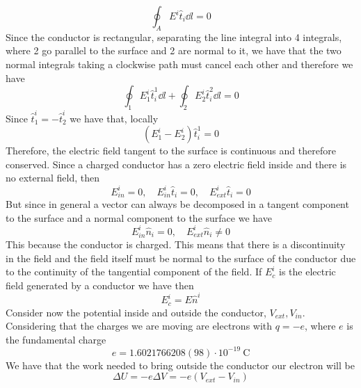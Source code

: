 \documentclass[../electromagnetism]{subfiles}
\begin{document}
\begin{equation}
	\oint_AE^i\hat{t}_i\dd l=0
	\label{eq:between2cond}
\end{equation}
Since the conductor is rectangular, separating the line integral into 4 integrals, where 2 go parallel to the surface and 2 are normal to it, we have that the two normal integrals taking a clockwise path must cancel each other and therefore we have
\begin{equation}
	\oint_1E^i_1\hat{t}^1_i\dd l+\oint_2E^i_2\hat{t}^2_i\dd l=0
	\label{eq:parallelint}
\end{equation}
Since $\hat{t}_1^i=-\hat{t}_2^i$ we have that, locally
\begin{equation}
	\left( E^i_1-E^i_2 \right)\hat{t}^1_i=0
	\label{eq:constangcond}
\end{equation}
Therefore, the electric field tangent to the surface is continuous and therefore conserved.
Since a charged conductor has a zero electric field inside and there is no external field, then
\begin{equation*}
	E^i_{in}=0,\quad E^i_{in}\hat{t}_i=0,\quad E^i_{ext}\hat{t}_i=0
\end{equation*}
But since in general a vector can always be decomposed in a tangent component to the surface and a normal component to the surface we have
\begin{equation*}
	{E}^i_{in}\hat{n}_i=0,\quad E^i_{ext}\hat{n}_i\ne0
\end{equation*}
This because the conductor is charged. This means that there is a discontinuity in the field and the field itself must be normal to the surface of the conductor due to the continuity of the tangential component of the field. If $E^i_c$ is the electric field generated by a conductor we have then
\begin{equation}
	E^i_c=E\hat{n}^i
	\label{eq:conductorfield}
\end{equation}
Consider now the potential inside and outside the conductor, $V_{ext},V_{in}$. Considering that the charges we are moving are electrons with $q=-e$, where $e$ is the fundamental charge
\begin{equation}
	e=1.6021766208(98)\cdot10^{-19}\ \mathrm{C}
	\label{eq:fundcharge}
\end{equation}
We have that the work needed to bring outside the conductor our electron will be
\begin{equation}
	\Delta U=-e\Delta V=-e\left( V_{ext}-V_{in} \right)
	\label{eq:workfunction}
\end{equation}
\end{document}
